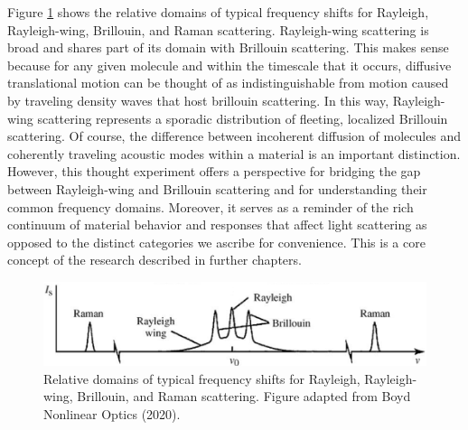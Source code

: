 Figure \ref{fig:Introduction:scattering-domains} shows the relative domains of typical frequency shifts for Rayleigh, Rayleigh-wing, Brillouin, and Raman scattering. Rayleigh-wing scattering is broad and shares part of its domain with Brillouin scattering. This makes sense because for any given molecule and within the timescale that it occurs, diffusive translational motion can be thought of as indistinguishable from motion caused by traveling density waves that host brillouin scattering. In this way, Rayleigh-wing scattering represents a sporadic distribution of fleeting, localized Brillouin scattering. Of course, the difference between incoherent diffusion of molecules and coherently traveling acoustic modes within a material is an important distinction. However, this thought experiment offers a perspective for bridging the gap between Rayleigh-wing and Brillouin scattering and for understanding their common frequency domains. Moreover, it serves as a reminder of the rich continuum of material behavior and responses that affect light scattering as opposed to the distinct categories we ascribe for convenience. This is a core concept of the research described in further chapters.%


\begin{figure}[t] %
\centering
\includegraphics[width=.7\textwidth]{figs/1-Intro/Boyd scattering frequency shift domains.png}
\caption[Relative domains of typical frequency shifts for Rayleigh, Rayleigh-wing, Brillouin, and Raman scattering.]{Relative domains of typical frequency shifts for Rayleigh, Rayleigh-wing, Brillouin, and Raman scattering. Figure adapted from Boyd Nonlinear Optics (2020). \cite{boyd2020nonlinear}}
\label{fig:Introduction:scattering-domains}
\end{figure}

